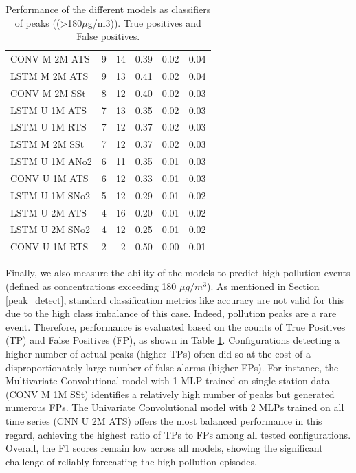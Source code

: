 \documentclass[12pt,a4paper]{book}
\begin{document}
\begin{table}[h]
\begin{tabular}{lrrrrr}
    CONV M 2M ATS & 9 & 14 & 0.39 & 0.02 & 0.04 \\
    LSTM M 2M ATS & 9 & 13 & 0.41 & 0.02 & 0.04 \\
    CONV M 2M SSt & 8 & 12 & 0.40 & 0.02 & 0.03 \\
    LSTM U 1M ATS & 7 & 13 & 0.35 & 0.02 & 0.03 \\
    LSTM U 1M RTS & 7 & 12 & 0.37 & 0.02 & 0.03 \\
    LSTM M 2M SSt & 7 & 12 & 0.37 & 0.02 & 0.03 \\
    LSTM U 1M ANo2 & 6 & 11 & 0.35 & 0.01 & 0.03 \\
    CONV U 1M ATS & 6 & 12 & 0.33 & 0.01 & 0.03 \\
    LSTM U 1M SNo2 & 5 & 12 & 0.29 & 0.01 & 0.02 \\
    LSTM U 2M ATS & 4 & 16 & 0.20 & 0.01 & 0.02 \\
    LSTM U 2M SNo2 & 4 & 12 & 0.25 & 0.01 & 0.02 \\
    CONV U 1M RTS & 2 & 2 & 0.50 & 0.00 & 0.01 \\
\bottomrule
\end{tabular}

\caption{Performance of the different models as classifiers of peaks ((>180$\mu$g/m3)). True positives and False positives.  }
\label{tab:exp2a_classif}
\end{table}

Finally, we also measure the ability of the models to predict high-pollution events (defined as \no{} concentrations exceeding 180 $\mu g/m^3$). As mentioned in Section \ref{peak_detect}, standard classification metrics like accuracy are not valid for this due to the high class imbalance of this case. Indeed, pollution peaks are a rare event. Therefore, performance is evaluated based on the counts of True Positives (TP) and False Positives (FP), as shown in Table \ref{tab:exp2a_classif}. Configurations detecting a higher number of actual peaks (higher TPs) often did so at the cost of a disproportionately large number of false alarms (higher FPs). For instance, the Multivariate Convolutional model with 1 MLP trained on single station data (CONV M 1M SSt) identifies a relatively high number of peaks but generated numerous FPs. The Univariate Convolutional model with 2 MLPs trained on all time series (CNN U 2M ATS) offers the most balanced performance in this regard, achieving the highest ratio of TPs to FPs among all tested configurations. Overall, the F1 scores remain low across all models, showing the significant challenge of reliably forecasting the high-pollution episodes.
\end{document}
